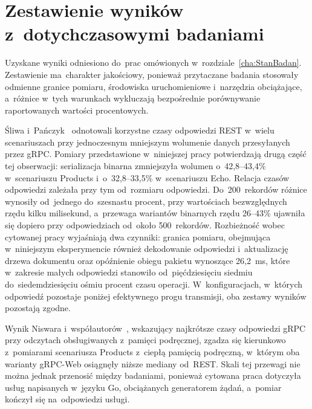 \section{Zestawienie wyników z~dotychczasowymi badaniami}
\label{sec:ZestawienieZBadaniami}

Uzyskane wyniki odniesiono do~prac omówionych w~rozdziale~\ref{cha:StanBadan}. Zestawienie ma~charakter jakościowy, ponieważ przytaczane badania stosowały odmienne granice pomiaru, środowiska uruchomieniowe i~narzędzia obciążające, a~różnice w~tych warunkach wykluczają bezpośrednie porównywanie raportowanych wartości procentowych.

Śliwa i~Pańczyk~\cite{bib:SliwaPanczyk2021} odnotowali korzystne czasy odpowiedzi REST w~wielu scenariuszach przy jednoczesnym mniejszym wolumenie danych przesyłanych przez gRPC. Pomiary przedstawione w~niniejszej pracy potwierdzają drugą część tej obserwacji: serializacja binarna zmniejszyła wolumen o~42,8--43,4\% w~scenariuszu Products i~o~32,8--33,5\% w~scenariuszu Echo. Relacja czasów odpowiedzi zależała przy tym od~rozmiaru odpowiedzi. Do~200~rekordów różnice wynosiły od~jednego do~szesnastu procent, przy wartościach bezwzględnych rzędu kilku milisekund, a~przewaga wariantów binarnych rzędu 26--43\% ujawniła się dopiero przy odpowiedziach od~około 500~rekordów. Rozbieżność wobec cytowanej pracy wyjaśniają dwa czynniki: granica pomiaru, obejmująca w~niniejszym eksperymencie również dekodowanie odpowiedzi i~aktualizację drzewa dokumentu oraz opóźnienie obiegu pakietu wynoszące 26,2~ms, które w~zakresie małych odpowiedzi stanowiło od~pięćdziesięciu siedmiu do~siedemdziesięciu ośmiu procent czasu operacji. W~konfiguracjach, w~których odpowiedź pozostaje poniżej efektywnego progu transmisji, oba zestawy wyników pozostają zgodne.

Wynik Niswara i~współautorów~\cite{bib:Niswar2024}, wskazujący najkrótsze czasy odpowiedzi gRPC przy odczytach obsługiwanych z~pamięci podręcznej, zgadza się kierunkowo z~pomiarami scenariusza Products z~ciepłą pamięcią podręczną, w~którym oba warianty gRPC-Web osiągnęły niższe mediany od~REST. Skali tej przewagi nie można jednak przenosić między badaniami, ponieważ cytowana praca dotyczyła usług napisanych w~języku Go, obciążanych generatorem żądań, a~pomiar kończył się na~odpowiedzi usługi.

